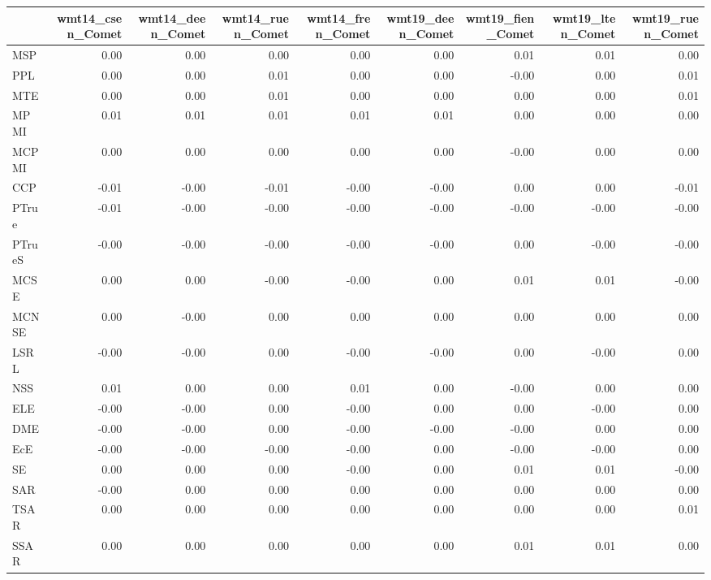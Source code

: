 \begin{tabular}{lrrrrrrrr}
\toprule
 & wmt14\_csen\_Comet & wmt14\_deen\_Comet & wmt14\_ruen\_Comet & wmt14\_fren\_Comet & wmt19\_deen\_Comet & wmt19\_fien\_Comet & wmt19\_lten\_Comet & wmt19\_ruen\_Comet \\
\midrule
MSP & 0.00 & 0.00 & 0.00 & 0.00 & 0.00 & 0.01 & 0.01 & 0.00 \\
PPL & 0.00 & 0.00 & 0.01 & 0.00 & 0.00 & -0.00 & 0.00 & 0.01 \\
MTE & 0.00 & 0.00 & 0.01 & 0.00 & 0.00 & 0.00 & 0.00 & 0.01 \\
MPMI & 0.01 & 0.01 & 0.01 & 0.01 & 0.01 & 0.00 & 0.00 & 0.00 \\
MCPMI & 0.00 & 0.00 & 0.00 & 0.00 & 0.00 & -0.00 & 0.00 & 0.00 \\
CCP & -0.01 & -0.00 & -0.01 & -0.00 & -0.00 & 0.00 & 0.00 & -0.01 \\
PTrue & -0.01 & -0.00 & -0.00 & -0.00 & -0.00 & -0.00 & -0.00 & -0.00 \\
PTrueS & -0.00 & -0.00 & -0.00 & -0.00 & -0.00 & 0.00 & -0.00 & -0.00 \\
MCSE & 0.00 & 0.00 & -0.00 & -0.00 & 0.00 & 0.01 & 0.01 & -0.00 \\
MCNSE & 0.00 & -0.00 & 0.00 & 0.00 & 0.00 & 0.00 & 0.00 & 0.00 \\
LSRL & -0.00 & -0.00 & 0.00 & -0.00 & -0.00 & 0.00 & -0.00 & 0.00 \\
NSS & 0.01 & 0.00 & 0.00 & 0.01 & 0.00 & -0.00 & 0.00 & 0.00 \\
ELE & -0.00 & -0.00 & 0.00 & -0.00 & 0.00 & 0.00 & -0.00 & 0.00 \\
DME & -0.00 & -0.00 & 0.00 & -0.00 & -0.00 & -0.00 & 0.00 & 0.00 \\
EcE & -0.00 & -0.00 & -0.00 & -0.00 & 0.00 & -0.00 & -0.00 & 0.00 \\
SE & 0.00 & 0.00 & 0.00 & -0.00 & 0.00 & 0.01 & 0.01 & -0.00 \\
SAR & -0.00 & 0.00 & 0.00 & 0.00 & 0.00 & 0.00 & 0.00 & 0.00 \\
TSAR & 0.00 & 0.00 & 0.00 & 0.00 & 0.00 & 0.00 & 0.00 & 0.01 \\
SSAR & 0.00 & 0.00 & 0.00 & 0.00 & 0.00 & 0.01 & 0.01 & 0.00 \\
\bottomrule
\end{tabular}
